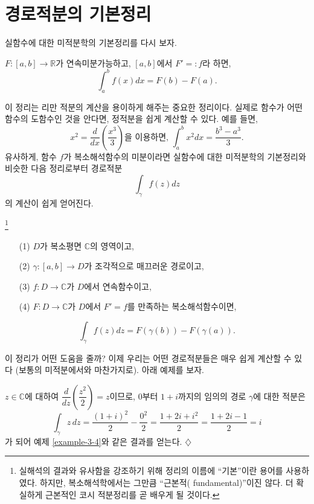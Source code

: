 \section{경로적분의 기본정리}

실함수에 대한 미적분학의 기본정리를 다시 보자.
\begin{salt_theorem} \label{thm-3-2}
$F:[a,b] \to \mathbb R$가 연속미분가능하고, 
$[a,b]$에서 $F'=:f$라 하면,
\[
\int_a^b f(x)dx = F(b) - F(a).
\]
\end{salt_theorem}

이 정리는 리만 적분의 계산을 용이하게 해주는 중요한 정리이다. 
실제로 함수가 어떤 함수의 도함수인 것을 안다면, 정적분을 쉽게 계산할 수 있다.
예를 들면,
\[
x^2 = \dfrac d{dx}\left( \dfrac{x^3}3\right) \text{을 이용하면, }
\int_a^b x^2 dx = \dfrac{b^3-a^3}3.
\]
유사하게,  함수 $f$가 복소해석함수의 미분이라면 
실함수에 대한 미적분학의 기본정리와 비슷한 다음 정리로부터 
경로적분
\[
\int_\gamma f(z)dz
\]
의 계산이 쉽게 얻어진다.

\begin{salt_theorem} 
\footnote{실해석의 결과와 유사함을 강조하기 위해  정리의 이름에
``기본''이란 용어를 사용하였다. 하지만, 복소해석학에서는
그만큼 ``근본적( fundamental)''이진 않다. 
더 확실하게 근본적인 코시 적분정리를 곧 배우게 될 것이다. }
\label{thm-3-3}
\
\begin{itemize}
\item[(1)] $D$가 복소평면 $\mathbb C$의 영역이고,
\item[(2)] $\gamma : [a,b] \to D$가 조각적으로 매끄러운 경로이고,
\item[(3)] $f:D\to\mathbb C$가 $D$에서 연속함수이고,
\item[(4)] $F:D\to \mathbb C$가 $D$에서 $F'=f$를 만족하는 복소해석함수이면,
\end{itemize}
\[
\int_\gamma f(z)dz = F(\gamma(b)) - F(\gamma(a)).
\]
\end{salt_theorem}

이 정리가 어떤 도움을 줄까?
이제 우리는 어떤 경로적분들은 매우 쉽게 계산할 수 있다
(보통의 미적분에서와 마찬가지로).
아래 예제를 보자.

\begin{salt_example}\label{example-3-5}
$z\in\mathbb C$에 대하여
$\dfrac d{dz}\left( \dfrac{z^2}2\right)=z$이므로,
$0$부터 $1+i$까지의 임의의 경로 $\gamma$에 대한 적분은
\[
\int_\gamma z\, dz = \dfrac{(1+i)^2}2 - \dfrac{0^2}2 
= \dfrac{1+2i+i^2}2 = \dfrac{1+2i-1}2 = i
\]
가 되어 예제 \ref{example-3-4}와 같은 결과를 얻는다.
\hfill $\diamondsuit$
\end{salt_example}

